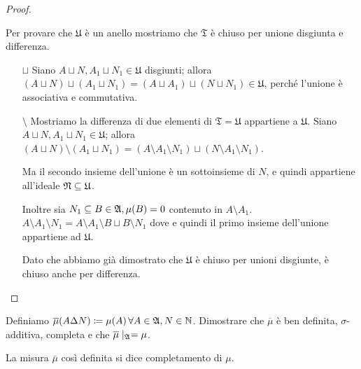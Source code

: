 \documentclass[../EserciziIstituzioniAnalisi.tex]{subfiles}
\begin{document}
\begin{proof}
\begin{enumerate}
\begin{itemize}
      Per provare che $\mathfrak{U}$ è un anello mostriamo che $\mathfrak{T}$ è chiuso per unione disgiunta e differenza.
      \begin{itemize}
        \item[$\sqcup$] Siano $A\sqcup N, A_1\sqcup N_1\in\mathfrak{U}$ disgiunti; allora $(A\sqcup N) \sqcup (A_1\sqcup N_1)= (A \sqcup A_1) \sqcup (N\sqcup N_1)\in\mathfrak{U}$, perché l'unione è associativa e commutativa.
        \item[$\setminus$] Mostriamo la differenza di due elementi di $\mathfrak{T}=\mathfrak{U}$ appartiene a $\mathfrak{U}$. Siano $A\sqcup N, A_1\sqcup N_1\in\mathfrak{U}$; allora $(A\sqcup N) \setminus (A_1\sqcup N_1)=(A\setminus A_1\setminus N_1) \sqcup (N\setminus A_1\setminus N_1)$.

        Ma il secondo insieme dell'unione è un sottoinsieme di $N$, e quindi appartiene all'ideale $\mathfrak N\subseteq \mathfrak{U}$.

        Inoltre sia $N_1\subseteq B\in \mathfrak A, \mu(B)=0$ contenuto in $A\setminus A_1$. $A\setminus A_1\setminus N_1=A\setminus A_1\setminus B \sqcup B\setminus N_1$ dove e quindi il primo insieme dell'unione appartiene ad $\mathfrak{U}$.

        Dato che abbiamo già dimostrato che $\mathfrak{U}$ è chiuso per unioni disgiunte, è chiuso anche per differenza.
      \end{itemize}
    \end{itemize}
  \end{enumerate}
\end{proof}
\begin{exercise}[27/10/2016]
  Definiamo $\overline \mu(A \Delta N) \coloneqq \mu (A) \,\forall A \in \mathfrak A,N\in\mathbb N$.
  Dimostrare che $\overline \mu$ è ben definita, $\sigma$-additiva, completa e che $\overline \mu\mid_{\mathfrak A}=\mu$.
\end{exercise}
\begin{remark}
  La misura $\overline\mu$ così definita si dice completamento di $\mu$.
\end{remark}
\end{document}
